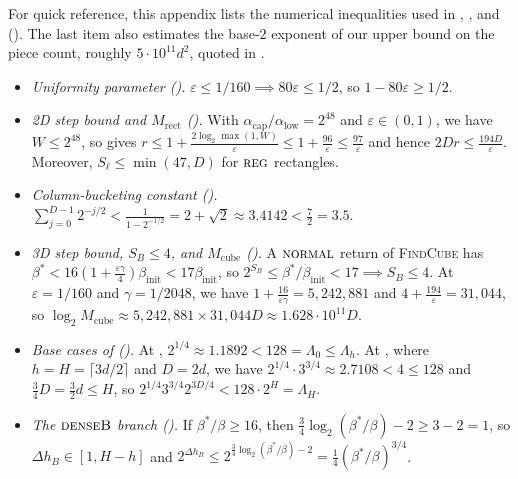 \documentclass[11pt]{article}
\theoremstyle{definition}
\newcommand{\FindCube}{\textnormal{\textsc{FindCube}}}
\newcommand{\tagreg}{\textnormal{\textsc{reg}}}
\newcommand{\tagdenseB}{\textnormal{\textsc{denseB}}}
\newcommand{\tagnormal}{\textnormal{\textsc{normal}}}
\begin{document}
For quick reference, this appendix lists the numerical inequalities used in , , and  (). The last item also estimates the base-$2$ exponent of our upper bound on the piece count, roughly $5 \cdot 10^{11} d^2$, quoted in .
\begin{itemize}[leftmargin=*]
    \item \emph{Uniformity parameter ().} $\varepsilon \le 1/160 \implies 80\varepsilon \le 1/2$, so $1 - 80\varepsilon \ge 1/2$.
    \item \emph{2D step bound and $M_{\text{rect}}$ ().} With $\alpha_{\text{cap}}/\alpha_{\text{low}} = 2^{48}$ and $\varepsilon \in (0, 1)$, we have $W \le 2^{48}$, so  gives $r \le 1 + \frac{2\log_2 \max(1, W)}{\varepsilon} \le 1 + \frac{96}{\varepsilon} \le \frac{97}{\varepsilon}$ and hence $2Dr \le \frac{194D}{\varepsilon}$. Moreover, $S_\ell \le \min(47, D)$ for $\tagreg$ rectangles.
    \item \emph{Column-bucketing constant ().} $\sum_{j=0}^{D-1} 2^{-j/2} < \frac{1}{1 - 2^{-1/2}} = 2 + \sqrt{2} \approx 3.4142 < \frac{7}{2} = 3.5$.
    \item \emph{3D step bound, $S_B \le 4$, and $M_{\text{cube}}$ ().} A $\tagnormal$ return of \FindCube{} has $\beta^* < 16(1 + \frac{\varepsilon\gamma}{4})\beta_{\text{init}} < 17\beta_{\text{init}}$, so $2^{S_B} \le \beta^*/\beta_{\text{init}} < 17 \implies S_B \le 4$. At $\varepsilon = 1/160$ and $\gamma = 1/2048$, we have $1 + \frac{16}{\varepsilon\gamma} = 5{,}242{,}881$ and $4 + \frac{194}{\varepsilon} = 31{,}044$, so $\log_2 M_{\text{cube}} \approx 5{,}242{,}881 \times 31{,}044 D \approx 1.628 \cdot 10^{11} D$.
    \item \emph{Base cases of  ().} At , $2^{1/4} \approx 1.1892 < 128 = \Lambda_0 \le \Lambda_h$. At , where $h = H = \lceil 3d/2 \rceil$ and $D = 2d$, we have $2^{1/4} \cdot 3^{3/4} \approx 2.7108 < 4 \le 128$ and $\frac{3}{4}D = \frac{3}{2}d \le H$, so $2^{1/4}3^{3/4}2^{3D/4} < 128 \cdot 2^H = \Lambda_H$.
    \item \emph{The $\tagdenseB$ branch ().} If $\beta^*/\beta \ge 16$, then $\frac{3}{4}\log_2(\beta^*/\beta) - 2 \ge 3 - 2 = 1$, so $\Delta h_B \in [1, H-h]$ and $2^{\Delta h_B} \le 2^{\frac{3}{4}\log_2(\beta^*/\beta) - 2} = \frac{1}{4}(\beta^*/\beta)^{3/4}$.

\end{itemize}
\end{document}
